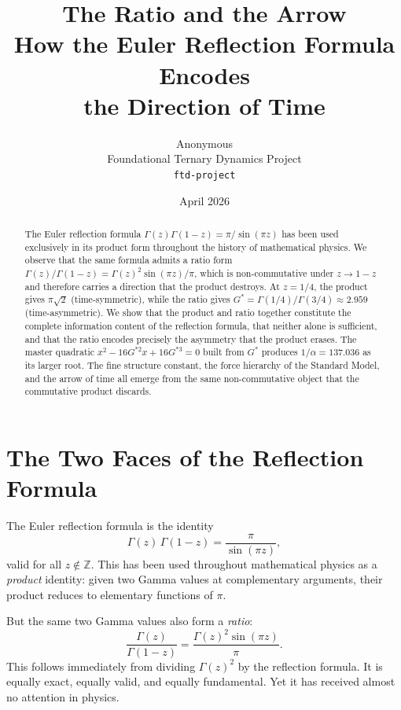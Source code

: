 \documentclass[12pt,letterpaper]{article}
\title{\textbf{The Ratio and the Arrow}\\[6pt]
\large How the Euler Reflection Formula Encodes\\
the Direction of Time}
\author{Anonymous\\
\small Foundational Ternary Dynamics Project\\
\small\texttt{ftd-project}}
\date{April 2026}
\begin{document}
\maketitle

\begin{abstract}
The Euler reflection formula $\Gamma(z)\Gamma(1-z) = \pi/\sin(\pi z)$ has been used exclusively in its product form throughout the history of mathematical physics. We observe that the same formula admits a ratio form $\Gamma(z)/\Gamma(1-z) = \Gamma(z)^2\sin(\pi z)/\pi$, which is non-commutative under $z \to 1-z$ and therefore carries a direction that the product destroys. At $z = 1/4$, the product gives $\pi\sqrt{2}$ (time-symmetric), while the ratio gives $G^* = \Gamma(1/4)/\Gamma(3/4) \approx 2.959$ (time-asymmetric). We show that the product and ratio together constitute the complete information content of the reflection formula, that neither alone is sufficient, and that the ratio encodes precisely the asymmetry that the product erases. The master quadratic $x^2 - 16G^{*2}x + 16G^{*3} = 0$ built from $G^*$ produces $1/\alpha = 137.036$ as its larger root. The fine structure constant, the force hierarchy of the Standard Model, and the arrow of time all emerge from the same non-commutative object that the commutative product discards.
\end{abstract}

\section{The Two Faces of the Reflection Formula}

The Euler reflection formula is the identity
\begin{equation}
\Gamma(z)\,\Gamma(1-z) = \frac{\pi}{\sin(\pi z)},
\label{eq:reflection}
\end{equation}
valid for all $z \notin \mathbb{Z}$. This has been used throughout mathematical physics as a \emph{product} identity: given two Gamma values at complementary arguments, their product reduces to elementary functions of $\pi$.

But the same two Gamma values also form a \emph{ratio}:
\begin{equation}
\frac{\Gamma(z)}{\Gamma(1-z)} = \frac{\Gamma(z)^2 \sin(\pi z)}{\pi}.
\label{eq:ratio}
\end{equation}
This follows immediately from dividing $\Gamma(z)^2$ by the reflection formula. It is equally exact, equally valid, and equally fundamental. Yet it has received almost no attention in physics.
\end{document}
